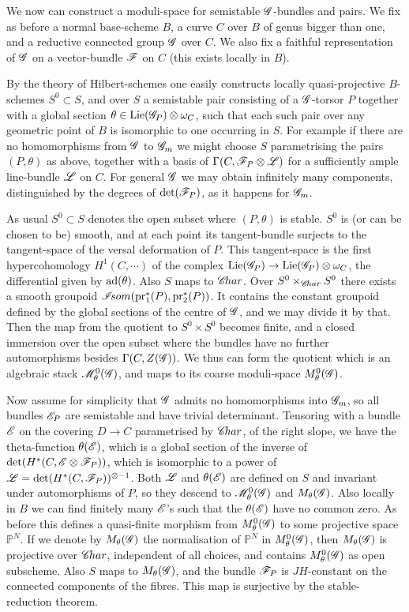 \documentclass[12pt,english]{smfart}
\theoremstyle{plain} \newtheorem{innerthm}{Theorem} \newtheorem{innerlem}{Lemma} \newtheorem{innerprop}{Proposition} \newtheorem{innercor}{Corollary} \theoremstyle{definition} \newtheorem{innerdefn}{Definition} \newtheorem{innerconstr}{Construction} \theoremstyle{remark} \newtheorem*{remark}{Remark} \newtheorem*{remarks}{Remarks} \newtheorem*{applications}{Applications}
\begin{document}
We now can construct a moduli-space for semistable $\mathscr{G}$-bundles and pairs. We fix as before a normal base-scheme $B$, a curve $C$ over $B$ of genus bigger than one, and a reductive connected group $\mathscr{G}$ over $C$. We also fix a faithful representation of $\mathscr{G}$ on a vector-bundle $\mathscr{F}$ on $C$ (this exists locally in $B$).

By the theory of Hilbert-schemes one easily constructs locally quasi-projective $B$-schemes $S^0\subset S$, and over $S$ a semistable pair consisting of a $\mathscr{G}$-torsor $P$ together with a global section $\theta\in\operatorname{Lie}(\mathscr{G}_P)\otimes\omega_C$, such that each
such pair over any geometric point of $B$ is isomorphic to one occurring in $S$. For example if there are no homomorphisms from $\mathscr{G}$ to $\mathscr{G}_m$ we might choose $S$ parametrising the pairs $(P,\theta)$ as above, together with a basis of $\Gamma(C,\mathscr{F}_P\otimes\mathscr{L})$ for a sufficiently ample line-bundle $\mathscr{L}$ on $C$. For general $\mathscr{G}$ we may obtain infinitely many components, distinguished by the degrees of $\det(\mathscr{F}_P)$, as it happens for $\mathscr{G}_m$.

As usual $S^0\subset S$ denotes the open subset where $(P,\theta)$ is stable. $S^0$ is (or can be chosen to be) smooth, and at each point its tangent-bundle surjects to the tangent-space of the versal deformation of $P$. This tangent-space is the first hypercohomology $H^1(C,\cdots)$ of the complex $\operatorname{Lie}(\mathscr{G}_P)\to\operatorname{Lie}(\mathscr{G}_P)\otimes\omega_C$, the differential given by $\operatorname{ad}(\theta)$. Also $S$ maps to $\mathscr{C}\!har$. Over $S^0\times_{\mathscr{C}\!har}S^0$ there exists a smooth groupoid $\mathscr{I}\!som(\mathrm{pr}_1^*(P),\mathrm{pr}_2^*(P))$. It contains the constant groupoid defined by the global sections of the centre of $\mathscr{G}$, and we may divide it by that. Then the map from the quotient to $S^0\times S^0$ becomes finite, and a closed immersion over the open subset where the bundles have no further automorphisms besides $\Gamma(C,Z(\mathscr{G}))$. We thus can form the quotient which is an algebraic stack $\mathscr{M}_\theta^0(\mathscr{G})$, and maps to its coarse moduli-space $M_\theta^0(\mathscr{G})$.

Now assume for simplicity that $\mathscr{G}$ admits no homomorphisms into $\mathscr{G}_m$, so all bundles $\mathscr{E}_P$ are semistable and have trivial determinant. Tensoring with a bundle $\mathscr{E}$ on the covering $D\to C$ parametrised by $\mathscr{C}\!har$, of the right slope, we have the theta-function $\theta(\mathscr{E})$, which is a global section of the inverse of $\det(H^*(C,\mathscr{E}\otimes\mathscr{F}_P))$, which is isomorphic to a power of $\mathscr{L}=\det(H^*(C,\mathscr{F}_P))^{\otimes-1}$. Both $\mathscr{L}$ and $\theta(\mathscr{E})$ are defined on $S$ and invariant under automorphisms of $P$, so they descend to $\mathscr{M}_\theta^0(\mathscr{G})$ and $M_\theta(\mathscr{G})$. Also locally in $B$ we can find finitely many $\mathscr{E}$'s such that the $\theta(\mathscr{E})$ have no common zero. As before this defines a quasi-finite morphism from $M_\theta^0(\mathscr{G})$ to some projective space $\mathbb{P}^N$. If we denote by $M_\theta(\mathscr{G})$ the normalisation of $\mathbb{P}^N$ in $M_\theta^0(\mathscr{G})$, then $M_\theta(\mathscr{G})$ is projective over $\mathscr{C}\!har$, independent of all choices, and contains $M_\theta^0(\mathscr{G})$ as open subscheme. Also $S$ maps to $M_\theta(\mathscr{G})$, and the bundle $\mathscr{F}_P$ is $JH$-constant on the connected components of the fibres. This map is surjective by the stable-reduction theorem.
\end{document}
